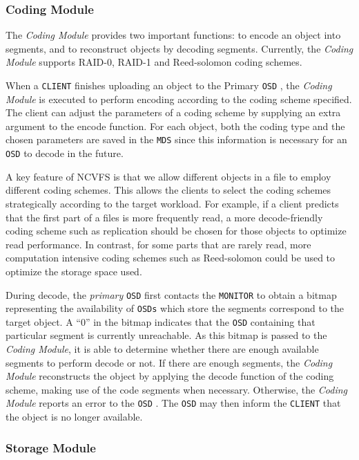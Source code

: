 \documentclass{article}
\def\osd{\texttt{OSD} }
\def\osds{\texttt{OSDs} }
\def\mds{\texttt{MDS} }
\def\client{\texttt{CLIENT} }
\def\monitor{\texttt{MONITOR} }
\begin{document}
\subsubsection{Coding Module}

The \textit{Coding Module} provides two important functions: to encode an object
into segments, and to reconstruct objects by decoding segments. 
Currently, the \textit{Coding Module} supports RAID-0, RAID-1 and Reed-solomon coding schemes.

When a \client finishes uploading an object to the Primary \osd, the \textit{Coding Module} is 
executed to perform encoding according to the coding scheme specified. The client
can adjust the parameters of a coding scheme by supplying an extra argument 
to the encode function. For each object, both the coding type and the 
chosen parameters are saved in the \mds since this information is necessary for an \osd
to decode in the future.

A key feature of NCVFS is that we allow different objects in a file to employ different 
coding schemes. This allows the clients to select the coding schemes strategically 
according to the target workload. For example, if a client predicts that the first part 
of a files is more frequently read, a more decode-friendly coding scheme such as replication
should be chosen for those objects to optimize read performance. 
In contrast, for some parts that are rarely read, more computation intensive 
coding schemes such as Reed-solomon could be used to optimize the storage space used.

During decode, the \textit{primary} \osd first contacts the \monitor to obtain a
bitmap representing the availability of \osds which store the segments 
correspond to the target object. A ``0'' in the bitmap indicates that the \osd
containing that particular segment is currently unreachable. As this bitmap is passed
to the \textit{Coding Module}, it is able to determine whether there are enough available
segments to perform decode or not. If there are enough segments, the \textit{Coding Module}
reconstructs the object by applying the decode function of the coding
scheme, making use of the code segments when necessary. Otherwise, the \textit{Coding Module}
reports an error to the \osd . The \osd may then inform the \client
that the object is no longer available.

\subsubsection{Storage Module}
\end{document}

